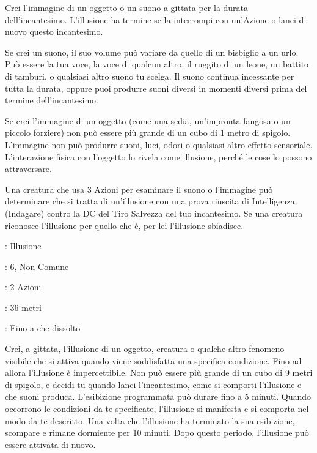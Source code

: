 \begin{multicols}{2}
Crei l'immagine di un oggetto o un suono a gittata per la durata dell'incantesimo. L'illusione ha termine se la interrompi con un'Azione o lanci di nuovo questo incantesimo.

Se crei un suono, il suo volume può variare da quello di un bisbiglio a un urlo. Può essere la tua voce, la voce di qualcun altro, il ruggito di un leone, un battito di tamburi, o qualsiasi altro suono tu scelga. Il suono continua incessante per tutta la durata, oppure puoi produrre suoni diversi in momenti diversi prima del termine dell'incantesimo.

Se crei l'immagine di un oggetto (come una sedia, un'impronta fangosa o un piccolo forziere) non può essere più grande di un cubo di 1 metro di spigolo. L'immagine non può produrre suoni, luci, odori o qualsiasi altro effetto sensoriale. L'interazione fisica con l'oggetto lo rivela come illusione, perché le cose lo possono attraversare.

Una creatura che usa 3 Azioni per esaminare il suono o l'immagine può determinare che si tratta di un'illusione con una prova riuscita di Intelligenza (Indagare) contro la DC del Tiro Salvezza del tuo incantesimo. Se una creatura riconosce l'illusione per quello che è, per lei l'illusione sbiadisce.

\noindent\colorbox{OBSSgold!10}{
\begin{minipage}{0.95\linewidth}
\begin{description}[noitemsep, topsep=0pt, parsep=0pt, partopsep=0pt, leftmargin=0cm, labelwidth=1.3cm]
	\item[\textbf{Lista}]: Illusione
	\item[\textbf{Livello}]: 6, Non Comune
	\item[\textbf{Lancio}]: 2 Azioni
	\item[\textbf{Gittata}]: 36 metri
	\item[\textbf{Durata}]: Fino a che dissolto
\end{description}
\end{minipage}}\smallskip

Crei, a gittata, l'illusione di un oggetto, creatura o qualche altro fenomeno visibile che si attiva quando viene soddisfatta una specifica condizione. Fino ad allora l'illusione è impercettibile. Non può essere più grande di un cubo di 9 metri di spigolo, e decidi tu quando lanci l'incantesimo, come si comporti l'illusione e che suoni produca. L'esibizione programmata può durare fino a 5 minuti. Quando occorrono le condizioni da te specificate, l'illusione si manifesta e si comporta nel modo da te descritto. Una volta che l'illusione ha terminato la sua esibizione, scompare e rimane dormiente per 10 minuti. Dopo questo periodo, l'illusione può essere attivata di nuovo.


\end{multicols}
